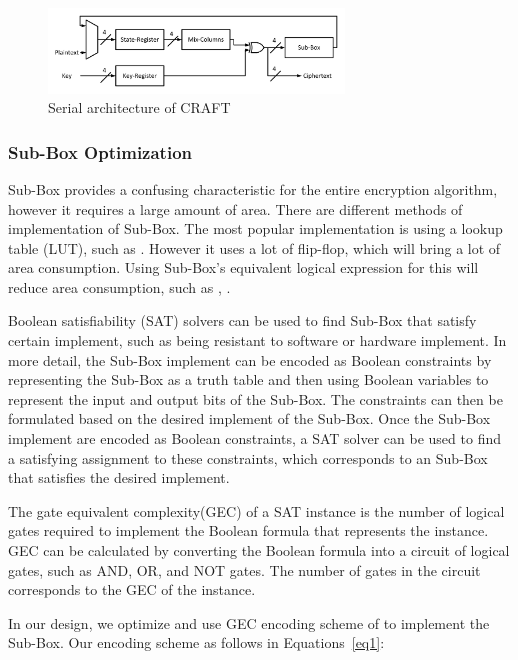 \documentclass[final,5p,times,twocolumn]{elsarticle}
\begin{document}
\begin{figure}[h]%
    \centering
    \includegraphics[width=0.7\textwidth]{serial-archticture.pdf}
    \caption{Serial architecture of CRAFT}\label{fig3}
\end{figure}


\subsubsection{Sub-Box Optimization }\label{subsubsec1}


Sub-Box provides a confusing characteristic for the entire encryption algorithm, however it requires a large amount of area.
There are different methods of implementation of Sub-Box.
The most popular implementation is using a lookup table (LUT), such as \cite{DBLP:journals/tcas/Lara-NinoDM17}.
However it uses a lot of flip-flop, which will bring a lot of area consumption.
Using Sub-Box's equivalent logical expression for this will reduce area consumption, such as \cite{bao2019peigen}, \cite{bib16}.

Boolean satisfiability (SAT) solvers can be used to find Sub-Box that satisfy certain implement, such as being resistant to software or hardware implement.
In more detail, the Sub-Box implement can be encoded as Boolean constraints by representing the Sub-Box as a truth table and then using Boolean variables to represent the input and output bits of the Sub-Box.
The constraints can then be formulated based on the desired implement of the Sub-Box.
Once the Sub-Box implement are encoded as Boolean constraints, a SAT solver can be used to find a satisfying assignment to these constraints, which corresponds to an Sub-Box that satisfies the desired implement.

The gate equivalent complexity(GEC) of a SAT instance is the number of logical gates required to implement the Boolean formula that represents the instance.
GEC can be calculated by converting the Boolean formula into a circuit of logical gates, such as AND, OR, and NOT gates.
The number of gates in the circuit corresponds to the GEC of the instance.

In our design, we optimize and use GEC encoding scheme of \cite{bib16} to implement the Sub-Box.
Our encoding scheme as follows in Equations~\ref{eq1}:
\end{document}
